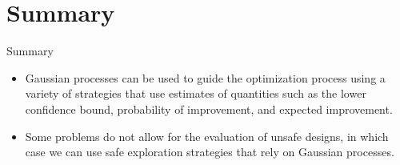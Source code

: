 \documentclass{beamer}
\begin{document}
\section{Summary}
\begin{frame}{Summary}
    \begin{itemize}
        \item Gaussian processes can be used to guide the optimization process using a variety of strategies that use estimates of quantities such as the lower confidence bound, probability of improvement, and expected improvement.
        \item Some problems do not allow for the evaluation of unsafe designs, in which case we can use safe exploration strategies that rely on Gaussian processes.
    \end{itemize}
\end{frame}
\end{document}
